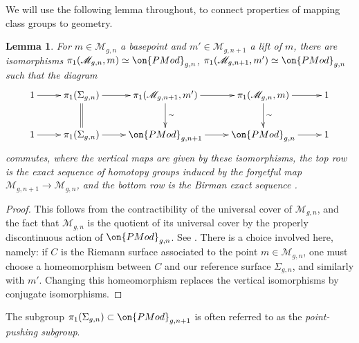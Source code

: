 \documentclass[12 pt]{amsart}
\theoremstyle{plain}
\newtheorem{lemma}[subsubsection]{Lemma}
\theoremstyle{definition}
\theoremstyle{remark}
\numberwithin{equation}{section}
\begin{document}
We will use the following lemma throughout, to connect properties of mapping class groups to geometry.
\begin{lemma}
	\label{lemma:mgn-fundamental-group}
	For $m \in \mathscr M_{g,n}$ a basepoint and $m'\in \mathscr M_{g, n+1}$ a lift of $m$, there are isomorphisms $\pi_1(\mathscr M_{g,n}, m) \simeq \on{PMod}_{g,n}$, $\pi_1(\mathscr M_{g,n+1}, m') \simeq \on{PMod}_{g,n}$ such that the diagram 
	$$\xymatrix{
	1 \ar[r] & \pi_1(\Sigma_{g,n}) \ar[r] \ar@{=}[d]& \pi_1(\mathscr{M}_{g,n+1}, m') \ar[r] \ar[d]^\sim & \pi_1(\mathscr{M}_{g,n}, m) \ar[r] \ar[d]^\sim & 1 \\
	1 \ar[r] & \pi_1(\Sigma_{g,n}) \ar[r] & \on{PMod}_{g,n+1} \ar[r] & \on{PMod}_{g,n}\ar[r] & 1
	}$$
	commutes, where the vertical maps are given by these isomorphisms, the top row is the exact sequence of homotopy groups induced by the forgetful map $\mathscr{M}_{g,n+1}\to \mathscr{M}_{g,n}$,  and the bottom row is the Birman exact sequence \cite[p.~98]{farbM:a-primer}. 
\end{lemma}
\begin{proof}
This follows from the contractibility of the universal cover of $\mathscr{M}_{g,
n}$, and the fact that $\mathscr{M}_{g,n}$ is the quotient of its universal
cover by the properly discontinuous action of $\on{PMod}_{g,n}$. See
\cite[\S10.6.3 and p. 353]{farbM:a-primer}. There is a choice involved here, namely: if $C$ is the Riemann surface associated to the point $m\in \mathscr{M}_{g,n}$, one must choose a homeomorphism between $C$ and our reference surface $\Sigma_{g,n}$, and similarly with $m'$. Changing this homeomorphism replaces the vertical isomorphisms by conjugate isomorphisms.
\end{proof}
The subgroup $ \pi_1(\Sigma_{g,n})\subset \on{PMod}_{g,n+1} $ is often referred to as the \emph{point-pushing subgroup}.
\end{document}
